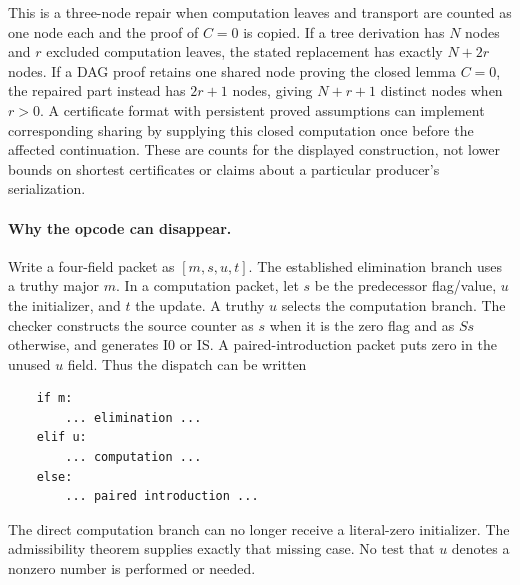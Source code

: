 This is a three-node repair when computation leaves and transport are
counted as one node each and the proof of $C=0$ is copied.  If a tree
derivation has $N$ nodes and $r$ excluded computation leaves, the stated
replacement has exactly $N+2r$ nodes.  If a DAG proof retains one shared
node proving the closed lemma $C=0$, the repaired part instead has
$2r+1$ nodes, giving $N+r+1$ distinct nodes when $r>0$.  A certificate
format with persistent proved assumptions can implement corresponding
sharing by supplying this closed computation once before the affected
continuation.  These are counts for the displayed construction, not
lower bounds on shortest certificates or claims about a particular
producer's serialization.

\paragraph{Why the opcode can disappear.}
Write a four-field packet as $[m,s,u,t]$.  The established elimination
branch uses a truthy major $m$.  In a computation packet, let $s$ be the
predecessor flag/value, $u$ the initializer, and $t$ the update.  A truthy
$u$ selects the computation branch.  The checker constructs the source
counter as $s$ when it is the zero flag and as $Ss$ otherwise, and
generates I0 or IS.  A paired-introduction packet puts zero in the unused
$u$ field.  Thus the dispatch can be written
\begin{verbatim}
    if m:
        ... elimination ...
    elif u:
        ... computation ...
    else:
        ... paired introduction ...
\end{verbatim}
The direct computation branch can no longer receive a literal-zero
initializer.  The admissibility theorem supplies exactly that missing
case.  No test that $u$ denotes a nonzero number is performed or needed.

